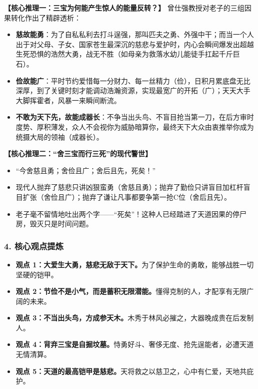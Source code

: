 \noindent\textbf{【核心推理一：三宝为何能产生惊人的能量反转？】}
曾仕强教授对老子的三组因果转化作出了精辟透析：
\begin{itemize}
    \item \textbf{慈故能勇}：为了自私私利去打斗逞强，那叫匹夫之勇、外强中干；而当一个人出于对父母、子女、国家苍生最深沉的慈悲与爱护时，内心会瞬间爆发出超越生死恐惧的浩然大勇，战无不胜（如母亲为救落水幼儿能徒手扛起千斤巨石）。
    \item \textbf{俭故能广}：平时节约爱惜每一分财力、每一丝精力（俭），日积月累底盘无比深厚，到了关键时刻才能调动浩瀚资源，实现最宽广的开拓（广）；天天大手大脚挥霍者，风暴一来瞬间断流。
    \item \textbf{不敢为天下先，故能成器长}：不争当出头鸟、不盲目抢当第一刀，在后方审时度势、厚积薄发，众人不会视你为威胁暗算你，最终天下大众由衷推举你成为统摄大局的领袖（成器长）。
\end{itemize}

\noindent\textbf{【核心推理二：“舍三宝而行三死”的现代警世】}
\begin{itemize}
    \item “今舍慈且勇；舍俭且广；舍后且先，死矣！”
    \item 现代人抛弃了慈悲只讲凶狠蛮勇（舍慈且勇）；抛弃了勤俭只讲盲目加杠杆盲目扩张（舍俭且广）；抛弃了谦让凡事都要争第一抢C位（舍后且先）。
    \item 老子毫不留情地吐出两个字——“死矣”！这种人已经踏进了天道因果的停尸房，毁灭只是时间问题。
\end{itemize}

\subsubsection{4. 核心观点提炼}
\begin{itemize}
    \item \textbf{观点 1：大爱生大勇，慈悲无敌于天下。}为了保护生命的勇敢，能够战胜一切坚硬的铠甲。
    \item \textbf{观点 2：节俭不是小气，而是蓄积无限潜能。}懂得克制的人，才配享有无限广阔的未来。
    \item \textbf{观点 3：不当出头鸟，方成参天木。}木秀于林风必摧之，大器晚成贵在后发制人。
    \item \textbf{观点 4：背弃三宝是自掘坟墓。}恃勇好斗、奢侈无度、抢先逞能者，必遭天道无情清算。
    \item \textbf{观点 5：天道的最高铠甲是慈悲。}天将救之以慈卫之，心中有仁爱，天地共庇护。
\end{itemize}

